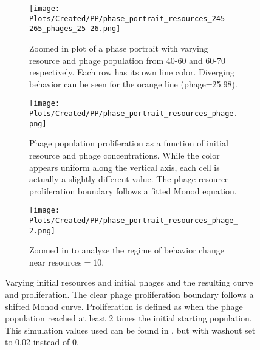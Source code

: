 \begin{figure}[]
    \centering
    \begin{subfigure}{0.49\linewidth}
        \centering
        \texttt{[image: Plots/Created/PP/phase\_portrait\_resources\_245-265\_phages\_25-26.png]}
        \caption{
            Zoomed in plot of a phase portrait with varying resource and phage population from 40-60 and 60-70 respectively. 
            Each row has its own line color. 
            Diverging behavior can be seen for the orange line (phage=25.98). 
        }
        \label{fig:created:phase_portrait_resources_245-265_phages_25-26}
    \end{subfigure}
    \hfill
    \begin{subfigure}{0.49\linewidth}
        \centering
        \texttt{[image: Plots/Created/PP/phase\_portrait\_resources\_phage.png]}
        \caption{
            Phage population proliferation as a function of initial resource and phage concentrations. 
            While the color appears uniform along the vertical axis, each cell is actually a slightly different value. 
            The phage-resource proliferation boundary follows a fitted Monod equation.
        }
        \label{fig:created:phase_portrait_resources_phage}
    \end{subfigure}
    \hfill
    \begin{subfigure}{0.49\linewidth}
        \centering
        \texttt{[image: Plots/Created/PP/phase\_portrait\_resources\_phage\_2.png]}
        \caption{
            Zoomed in to analyze the regime of behavior change near resources$=10$. 
        }
        \label{fig:created:phase_portrait_resources_phage_2}
    \end{subfigure}
    \caption{
        Varying initial resources and initial phages and the resulting curve and proliferation. 
        The clear phage proliferation boundary follows a shifted Monod curve. 
        Proliferation is defined as when the phage population reached at least 2 times the initial starting population. 
        This simulation values used can be found in , but with washout set to 0.02 instead of 0. 
    }
    \label{fig:created:phase_portrait_resource_phage_proliferate}
\end{figure}